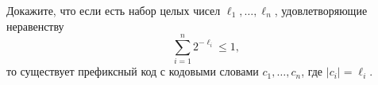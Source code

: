Докажите, что если есть набор целых чисел $\ell_1, \dots, \ell_n$, удовлетворяющие неравенству
$$
    \sum_{i = 1}^{n} 2^{-\ell_i} \le 1,
$$    
то существует префиксный код с кодовыми словами $c_1, \dots, c_n$, где $|c_i| = \ell_i$.